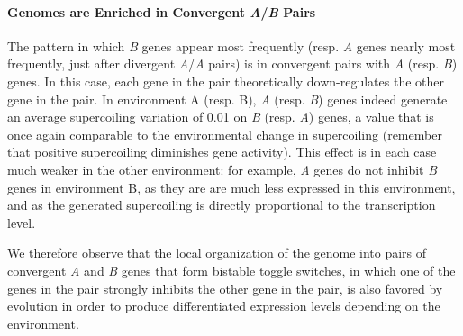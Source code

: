\paragraph{Genomes are Enriched in Convergent \emph{A}/\emph{B} Pairs}
The pattern in which \emph{B} genes appear most frequently (resp. \emph{A} genes nearly most frequently, just after divergent \emph{A}/\emph{A} pairs) is in convergent pairs with \emph{A} (resp. \emph{B}) genes.
In this case, each gene in the pair theoretically down-regulates the other gene in the pair.
In environment A (resp. B), \emph{A} (resp. \emph{B}) genes indeed generate an average supercoiling variation of 0.01 on \emph{B}  (resp. \emph{A}) genes, a value that is once again comparable to the environmental change in supercoiling (remember that positive supercoiling diminishes gene activity).
This effect is in each case much weaker in the other environment: for example, \emph{A} genes do not inhibit \emph{B} genes in environment B, as they are are much less expressed in this environment, and as the generated supercoiling is directly proportional to the transcription level.

We therefore observe that the local organization of the genome into pairs of convergent \emph{A} and \emph{B} genes that form bistable toggle switches, in which one of the genes in the pair strongly inhibits the other gene in the pair, is also favored by evolution in order to produce differentiated expression levels depending on the environment.



